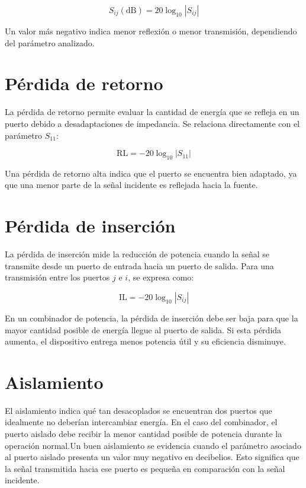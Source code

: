 \begin{equation}
S_{ij}(\text{dB}) = 20\log_{10}\left|S_{ij}\right|
\end{equation}

Un valor más negativo indica menor reflexión o menor transmisión, dependiendo del parámetro analizado.

\section{Pérdida de retorno}

La pérdida de retorno permite evaluar la cantidad de energía que se refleja en un puerto debido a desadaptaciones de impedancia. Se relaciona directamente con el parámetro $S_{11}$:

\begin{equation}
\text{RL} = -20\log_{10}\left|S_{11}\right|
\end{equation}

Una pérdida de retorno alta indica que el puerto se encuentra bien adaptado, ya que una menor parte de la señal incidente es reflejada hacia la fuente.

\section{Pérdida de inserción}

La pérdida de inserción mide la reducción de potencia cuando la señal se transmite desde un puerto de entrada hacia un puerto de salida. Para una transmisión entre los puertos $j$ e $i$, se expresa como:

\begin{equation}
\text{IL} = -20\log_{10}\left|S_{ij}\right|
\end{equation}

En un combinador de potencia, la pérdida de inserción debe ser baja para que la mayor cantidad posible de energía llegue al puerto de salida. Si esta pérdida aumenta, el dispositivo entrega menos potencia útil y su eficiencia disminuye.

\section{Aislamiento}

El aislamiento indica qué tan desacoplados se encuentran dos puertos que idealmente no deberían intercambiar energía. En el caso del combinador, el puerto aislado debe recibir la menor cantidad posible de potencia durante la operación normal.Un buen aislamiento se evidencia cuando el parámetro asociado al puerto aislado presenta un valor muy negativo en decibelios. Esto significa que la señal transmitida hacia ese puerto es pequeña en comparación con la señal incidente.

